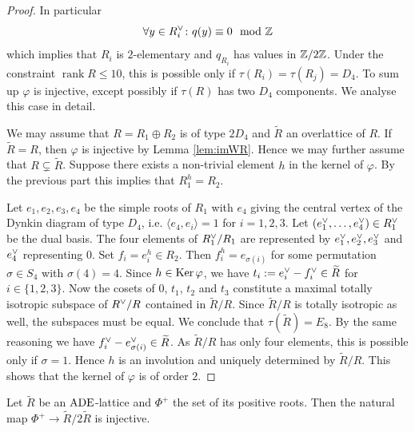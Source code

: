 \documentclass{amsart}
\numberwithin{procedure}{section}
\DeclareMathOperator{\rk}{rank}
\newcommand{\rl}{R}
\newcommand{\trl}{\widetilde{\rl}}
\renewcommand{\ker}{\Ker}
\begin{document}
\begin{proof}
 In particular
 \[\forall y \in \rl_i\dual \colon q(y) \equiv 0 \mod \Z\]
 which implies that $\rl_i$ is $2$-elementary and $q_{\rl_i}$ has values in $\mathord{\mathbb Z}/2\mathord{\mathbb Z}$.
 Under the constraint $\rk \rl \leq 10$, this is possible only if $\tau(\rl_i)=\tau(\rl_j)=D_4$.
 To sum up $\varphi$ is injective, except possibly if $\tau(\rl)$ has two $D_4$ components. We analyse this case in detail.
 \par
 We may assume that $\rl=\rl_1\oplus \rl_2$ is of type $2D_4$ and
 $\tilde{R}$ an overlattice of $R$. If $\trl = \rl$, then $\varphi$ is injective by Lemma \ref{lem:imWR}.
 Hence we may further assume that $\rl \subsetneq \trl$.
 Suppose there exists a non-trivial element $h$ in the kernel of $\varphi$. 
 By the previous part this implies that $R_1^h=R_2$.
\par
Let $e_1,e_2,e_3,e_4$ be the simple roots of $\rl_1$
with $e_4$ giving the central vertex of the Dynkin diagram of type $D_4$,
i.e. $\langle e_4,e_i \rangle =1$ for $i=1,2,3$.
Let $(e_1\dual , \dots,  e_4\dual ) \in \rl_1\dual $ be the dual basis. %
The four elements of $\rl_1\dual /\rl_1$ are represented by
$e_1\sp{\vee} , e_2\sp{\vee} , e_3\sp{\vee} $ and $e_4\sp{\vee} $
representing $0$.
Set $f_i = e_i^h \in \rl_2$. Then $f_i^h = e_{\sigma(i)}$
for some permutation $\sigma \in S_4$ with $\sigma(4)=4$.
Since $h \in \ker \varphi$,
we have $t_i:=e_i\dual  - f_i\dual  \in \trl$ for $i\in \{1,2,3\}$.
Now the cosets of $0$, $t_1$, $t_2$ and $t_3$ constitute a maximal totally isotropic subspace of $\rl\dual /\rl$ contained in $\trl/\rl$.
Since $\trl/R$ is totally isotropic as well, the subspaces must be equal. We conclude that $\tau(\trl)=E_8$.
By the same reasoning we have $f_i\dual-e_{\sigma(i)}\dual \in \trl$.
As $\trl/\rl$ has only four elements, this is possible only if $\sigma =1$. Hence $h$ is an involution and uniquely determined by $\trl/\rl$. This shows that the kernel of $\varphi$ is of order $2$.
\end{proof}
%
\begin{lemma}\label{lem:roots-mod2}
 Let $\trl$ be  an $\mathord{\rm ADE}$-lattice
  and $\Phi^+$ the set of its positive roots.
 Then the natural map $\Phi^+ \rightarrow\trl/2\trl$ is injective.
\end{lemma}
%
\end{document}
